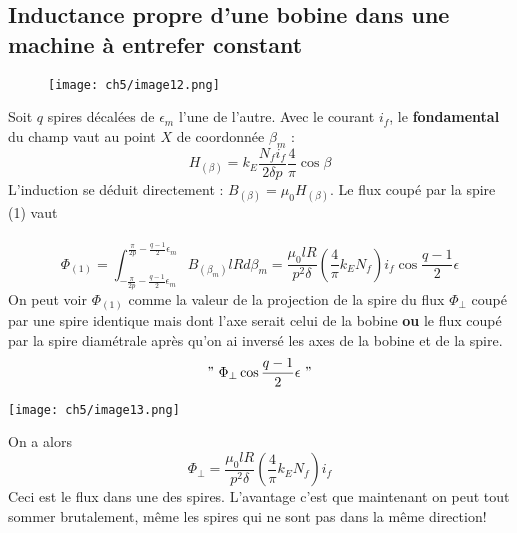 	\subsection{Inductance propre d'une bobine dans une machine à entrefer constant}
	\begin{wrapfigure}[8]{l}{5cm}
	\vspace{-8mm}
	\texttt{[image: ch5/image12.png]}
	\end{wrapfigure}
	Soit $q$ spires décalées de $\epsilon_m$ l'une de l'autre. Avec le courant $i_f$, 
	le \textbf{fondamental} du champ vaut au point $X$ de coordonnée $\beta_m$ :
	\begin{equation}
	H_{(\beta)} = k_E\dfrac{N_fi_f}{2\delta p}\dfrac{4}{\pi}\cos\beta
	\end{equation}
	L'induction se déduit directement : $B_{(\beta)} = \mu_0H_{(\beta)}$. Le flux 
	coupé par la spire (1) vaut \\
	\ \\
	
	\begin{equation}
	\Phi_{(1)} = \int_{-\frac{\pi}{2p}-\frac{q-1}{2}\epsilon_m}^{\frac{\pi}{2p}-
	\frac{q-1}{2}\epsilon_m} B_{(\beta_m)} lRd\beta_m = \dfrac{\mu_0lR}{p^2\delta}
	\left(\dfrac{4}{\pi}k_EN_f\right)i_f\cos\dfrac{q-1}{2}\epsilon
	\end{equation}
	On peut voir $\Phi_{(1)}$ comme la valeur de la projection de la spire du flux
	$\Phi_\perp$ coupé par une spire identique mais dont l'axe serait celui de la 
	bobine \textbf{ou} le flux coupé par la spire diamétrale après qu'on ai 
	inversé les axes de la bobine et de la spire.
	\begin{equation}
	"\ \Phi_\perp \cos\dfrac{q-1}{2}\epsilon\ "
	\end{equation}
	
	\begin{center}
	\texttt{[image: ch5/image13.png]}
	\end{center}
	On a alors
	\begin{equation}
	\Phi_\perp = \dfrac{\mu_0lR}{p^2\delta}\left(\dfrac{4}{\pi}k_EN_f\right)i_f
	\end{equation}
	Ceci est le flux dans une des spires. L'avantage c'est que maintenant on peut 
	tout sommer brutalement, même les spires qui ne sont pas dans la même direction!\\
	
